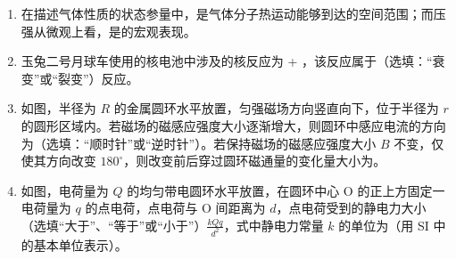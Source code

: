 \documentclass[\gkver]{gaokaozhenti}
\begin{document}
\begin{enumerate}
{由 $F_{\text{安}}=\frac{B^{2}l^{2}v}{R}=ma$ 可知，进磁场过程中的平均安培力较大，进磁场和出磁场过程的位移相等，由 $W=Fs$ 可知 $W_{1} > W_{2}$。

线框在进、出磁场过程中都做加速度减小的减速运动，可以画出对应的 $v-t$ 图像，在位移相等的情况下，根据图像可得出 $t_{1} < t_{2}$ 的结论。

\onepicture[w=5.50cm]{}

正确选项为 B。
}

\item
在描述气体性质的状态参量中，是气体分子热运动能够到达的空间范围；而压强从微观上看，是的宏观表现。

\item
玉兔二号月球车使用的核电池中涉及的核反应为  + ，该反应属于（选填：“衰变”或“裂变”）反应。

\item
如图，半径为 $R$ 的金属圆环水平放置，匀强磁场方向竖直向下，位于半径为 $r$ 的圆形区域内。若磁场的磁感应强度大小逐渐增大，则圆环中感应电流的方向为（选填：“顺时针”或“逆时针”）。若保持磁场的磁感应强度大小 $B$ 不变，仅使其方向改变 $180^{\circ}$，则改变前后穿过圆环磁通量的变化量大小为。
\onepicture[align=right, w=3.00cm]{}

\item
如图，电荷量为 $Q$ 的均匀带电圆环水平放置，在圆环中心 O 的正上方固定一电荷量为 $q$ 的点电荷，点电荷与 O 间距离为 $d$，点电荷受到的静电力大小（选填“大于”、“等于”或“小于”）$\frac{kQq}{d^{2}}$，式中静电力常量 $k$ 的单位为\tkanswer[4cm]{$\UkgmcmsqAq$}（用 SI 中的基本单位表示）。
\onepicture[align=right, w=3.00cm]{}
\memoanswer{
\onepicture[w=4.50cm]{}

}
\end{enumerate}
\end{document}
